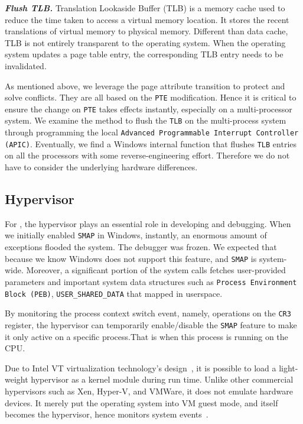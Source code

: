 
\textbf{\textit{Flush TLB.}} Translation Lookaside Buffer (TLB) is a memory cache used to reduce the time taken to access a virtual memory location. It stores the recent translations of virtual memory to physical memory. Different than data cache, TLB is not entirely transparent to the operating system. When the operating system updates a page table entry, the corresponding TLB entry needs to be invalidated.  

As mentioned above, we leverage the page attribute transition to protect and solve conflicts. They are all based on the \texttt{PTE} modification. Hence it is critical to ensure the change on \texttt{PTE} takes effects instantly, especially on a multi-processor system. We examine the method to flush the \texttt{TLB} on the multi-process system through programming the local \texttt{Advanced Programmable Interrupt Controller (APIC)}. Eventually, we find a Windows internal function that flushes \texttt{TLB} entries on all the processors with some reverse-engineering effort. Therefore we do not have to consider the underlying hardware differences.



\subsection{Hypervisor}


For \name, the hypervisor plays an essential role in developing and debugging. When we initially enabled \texttt{SMAP} in Windows, instantly, an enormous amount of exceptions flooded the system. The debugger was frozen.  We expected that because we know Windows does not support this feature, and \texttt{SMAP} is system-wide. Moreover, a significant portion of the system calls fetches user-provided parameters and important system data structures such as \texttt{Process Environment Block (PEB)}, \texttt{USER\_SHARED\_DATA} that mapped in userspace. 

By monitoring the process context switch event, namely, operations on the \texttt{CR3} register, the hypervisor can temporarily enable/disable the \texttt{SMAP} feature to make it only active on a specific process.That is when this process is running on the CPU.

Due to Intel VT virtualization technology's design~\cite{neiger2006intel}, it is possible to load a light-weight hypervisor as a kernel module during run time. Unlike other commercial hypervisors such as Xen, Hyper-V, and VMWare, it does not emulate hardware devices. It merely put the operating system into VM guest mode, and itself becomes the hypervisor, hence monitors system events~\cite{howtohide}.


